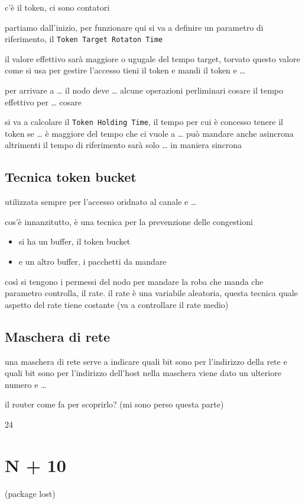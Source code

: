 \documentclass[11pt]{article}
\begin{document}
c'è il token, ci sono contatori

partiamo dall'inizio, per funzionare qui si va a definire un parametro di riferimento,
il \texttt{Token Target Rotaton Time}

il valore effettivo sarà maggiore o ugugale del tempo target, torvato questo valore come si usa per gestire l'accesso
tieni il token e mandi il token e \ldots{}

per arrivare a \ldots{} il nodo deve \ldots{} alcune operazioni perliminari
cosare il tempo effettivo per \ldots{} cosare

si va a calcolare il \texttt{Token Holding Time}, il tempo per cui è concesso tenere il token
se \ldots{} è maggiore del tempo che ci vuole a \ldots{} può mandare anche asincrona
altrimenti il tempo di riferimento sarà solo \ldots{} in maniera sincrona

\subsection{Tecnica token bucket}
\label{sec:orgb15be9b}
utilizzata sempre per l'accesso oridnato al canale e \ldots{}

cos'è innanzitutto, è una tecnica per la prevenzione delle congestioni
\begin{itemize}
\item si ha un buffer, il token bucket
\item e un altro buffer, i pacchetti da mandare
\end{itemize}

così si tengono i permessi del nodo per mandare la roba che manda
che parametro controlla, il rate.
il rate è una variabile aleatoria, questa tecnica quale aspetto del rate tiene costante (va a controllare il rate medio)

\subsection{Maschera di rete}
\label{sec:orgb3e596a}
una maschera di rete serve a indicare quali bit sono per l'indirizzo della rete e quali bit sono per l'indirizzo dell'host
nella maschera viene dato un ulteriore numero e \ldots{}

il router come fa per scoprirlo? (mi sono perso questa parte)

24

\section{N + 10}
\label{sec:org74378ba}
(package lost)
\end{document}
